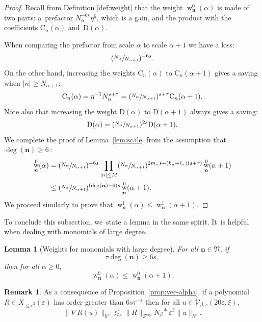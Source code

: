 \documentclass[10pt,a4paper]{amsart}
\DeclareMathOperator{\rw}{w}
\theoremstyle{plain}
\newtheorem{lemma}[theorem]{Lemma}
\theoremstyle{definition}
\newtheorem{remark}[theorem]{Remark}
\newcommand{\nb}{{\boldsymbol n}}
\newcommand{\Nb}{{\boldsymbol{\mathfrak{N}}}}
\newcommand{\1}{\mathbf{1}}
\let\epsilon\varepsilon
\begin{document}
\begin{proof}
Recall from Definition \ref{def:weight} that the weight $\rw_{\nb}^{0}(\alpha)$ is made of two parts: a~prefactor $N_{\alpha}^{-6s}\eta^{6}$, which is a gain, and the product with the coefficients $\mathrm{C}_{n}(\alpha)$ and~$\mathrm{D}(\alpha)$.

When comparing the prefactor from scale $\alpha$ to scale $\alpha+1$ we have a loss:
\[
(\sfrac{N_{\alpha}}{N_{\alpha+1}})^{-6s}.
\]
On the other hand, increasing the weights $\mathrm{C}_{n}(\alpha)$ to $\mathrm{C}_{n}(\alpha+1)$ gives a saving when $|n|\geq N_{\alpha+1}$:
\[
\mathrm{C}_{n}(\alpha) = \eta^{-1}N_{\alpha}^{s+\tau} = (\sfrac{N_{\alpha}}{N_{\alpha+1}})^{s+\tau}\mathrm{C}_{n}(\alpha+1).
\]
Note also that increasing the weight $\mathrm{D}(\alpha)$ to $\mathrm{D}(\alpha+1)$ always gives a saving:
\[
\mathrm{D}(\alpha)
= (\sfrac{N_{\alpha}}{N_{\alpha+1}})^{2s} \mathrm{D}(\alpha+1).
\]
We complete the proof of Lemma~\ref{lem:scale} from the assumption that $\deg(\nb)\geq6$\,:
\begin{equation*}
\begin{split}
\rw_{\nb}^{0}(\alpha) &= (\sfrac{N_{\alpha}}{N_{\alpha+1}})^{-6s}\prod_{|n|\leq M}(\sfrac{N_{\alpha}}{N_{\alpha+1}})^{2m_{n}s+(k_{n}+\ell_{n})(s+\tau)}\rw_{\nb}^{0}(\alpha+1) \\
&\leq (\sfrac{N_{\alpha}}{N_{\alpha+1}})^{(\deg(\nb)-6)s} \rw_{\nb}^{0}(\alpha+1).
\end{split}
\end{equation*}
We proceed similarly to prove that $\rw_{\nb}^{1}(\alpha)
\leq \rw_{\nb}^{1}(\alpha+1)$.
\end{proof}

To conclude this subsection, we~state a lemma in the same spirit. It~is helpful when dealing with monomials of large degree.

\begin{lemma}[Weights for monomials with large degree]
\label{lem:deg}
For all $\nb\in\Nb$, if
\begin{equation}
\label{eq:par-tau}
\tau\deg(\nb)\geq 6s,
\end{equation}
then for all $\alpha\geq 0$,
\[
\rw_{\nb}^{0}(\alpha)\leq \rw_{\nb}^{0}(\alpha+1).
\]
\end{lemma}

\begin{remark}\label{rem:deg} As a consequence of Proposition~\ref{prop:vec-alpha}, if a polynomial $R\in X_{\leq\overline{r}^{2}}(\epsilon)$ has order greater than $6s\tau^{-1}$ then for all $u\in\mathcal{V}_{\beta,s}(20\epsilon,\xi)$,
\[
\|\nabla R(u)\|_{h^{s}}\lesssim_{r} \|R\|_{Z^{\mathrm{sup}}} N_{\beta}^{-4s}\epsilon^{3}\|u\|_{h^{s}}.
\]
\end{remark}
\end{document}
